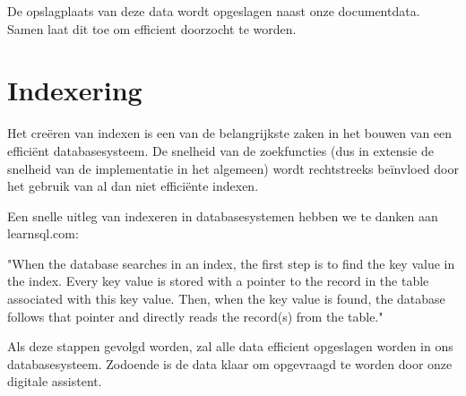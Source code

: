 De opslagplaats van deze data wordt opgeslagen naast onze documentdata.
Samen laat dit toe om efficient doorzocht te worden.

\section{Indexering}
Het creëren van indexen is een van de belangrijkste zaken in het bouwen van een efficiënt databasesysteem.
De snelheid van de zoekfuncties (dus in extensie de snelheid van de implementatie in het algemeen) wordt rechtstreeks beïnvloed door het gebruik van al dan niet efficiënte indexen.

Een snelle uitleg van indexeren in databasesystemen hebben we te danken aan learnsql.com:

\begin{displayquote}
	"When the database searches in an index, the first step is to find the key value in the index.
	Every key value is stored with a pointer to the record in the table associated with this key value.
	Then, when the key value is found, the database follows that pointer and directly reads the record(s) from the table."
	\autocite{learnSQL}
\end{displayquote}

Als deze stappen gevolgd worden, zal alle data efficient opgeslagen worden in ons databasesysteem. 
Zodoende is de data klaar om opgevraagd te worden door onze digitale assistent. 

